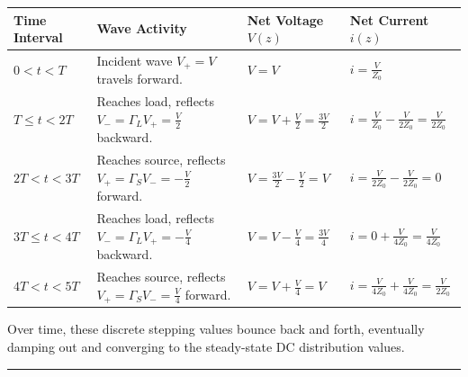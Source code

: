\documentclass[
]{article}
\begin{document}
\begin{longtable}[]{@{}
  >{\raggedright\arraybackslash}p{}
  >{\raggedright\arraybackslash}p{}
  >{\raggedright\arraybackslash}p{}
  >{\raggedright\arraybackslash}p{}@{}}
\toprule\noalign{}
\begin{minipage}[b]{\linewidth}\raggedright
Time Interval
\end{minipage} & \begin{minipage}[b]{\linewidth}\raggedright
Wave Activity
\end{minipage} & \begin{minipage}[b]{\linewidth}\raggedright
Net Voltage \(V(z)\)
\end{minipage} & \begin{minipage}[b]{\linewidth}\raggedright
Net Current \(i(z)\)
\end{minipage} \\
\midrule\noalign{}
\endhead
\bottomrule\noalign{}
\endlastfoot
\textbf{\(0 < t < T\)} & Incident wave \(V_+ = V\) travels forward. &
\(V = V\) & \(i = \frac{V}{Z_0}\) \\
\textbf{\(T \le t < 2T\)} & Reaches load, reflects
\(V_- = \Gamma_L V_+ = \frac{V}{2}\) backward. &
\(V = V + \frac{V}{2} = \frac{3V}{2}\) &
\(i = \frac{V}{Z_0} - \frac{V}{2Z_0} = \frac{V}{2Z_0}\) \\
\textbf{\(2T < t < 3T\)} & Reaches source, reflects
\(V_+ = \Gamma_S V_- = -\frac{V}{2}\) forward. &
\(V = \frac{3V}{2} - \frac{V}{2} = V\) &
\(i = \frac{V}{2Z_0} - \frac{V}{2Z_0} = 0\) \\
\textbf{\(3T \le t < 4T\)} & Reaches load, reflects
\(V_- = \Gamma_L V_+ = -\frac{V}{4}\) backward. &
\(V = V - \frac{V}{4} = \frac{3V}{4}\) &
\(i = 0 + \frac{V}{4Z_0} = \frac{V}{4Z_0}\) \\
\textbf{\(4T < t < 5T\)} & Reaches source, reflects
\(V_+ = \Gamma_S V_- = \frac{V}{4}\) forward. &
\(V = V + \frac{V}{4} = V\) &
\(i = \frac{V}{4Z_0} + \frac{V}{4Z_0} = \frac{V}{2Z_0}\) \\
\end{longtable}

Over time, these discrete stepping values bounce back and forth,
eventually damping out and converging to the steady-state DC
distribution values.

\begin{center}\rule{0.5\linewidth}{0.5pt}\end{center}
\end{document}
